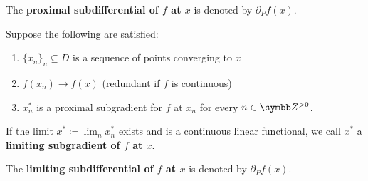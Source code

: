 \begin{definition}
\begin{defenum}
    The \textbf{proximal subdifferential of \( f \) at \( x \)} is denoted by \( \partial_P f(x) \).

    \item\label{def:subdifferentials/limiting}\cite[definition 11.10]{Clarke2013} Suppose the following are satisfied:
    \begin{enumerate}
      \item \( \{ x_n \}_n \subseteq D \) is a sequence of points converging to \( x \)
      \item \( f(x_n) \to f(x) \) (redundant if \( f \) is continuous)
      \item \( x_n^* \) is a proximal subgradient for \( f \) at \( x_n \) for every \( n \in \BB{Z}^{>0} \).
    \end{enumerate}

    If the limit \( x^* \coloneqq \lim_n x_n^* \) exists and is a continuous linear functional, we call \( x^* \) a \textbf{limiting subgradient of \( f \) at \( x \)}.

    The \textbf{limiting subdifferential of \( f \) at \( x \)} is denoted by \( \partial_P f(x) \).
  \end{defenum}
\end{definition}
